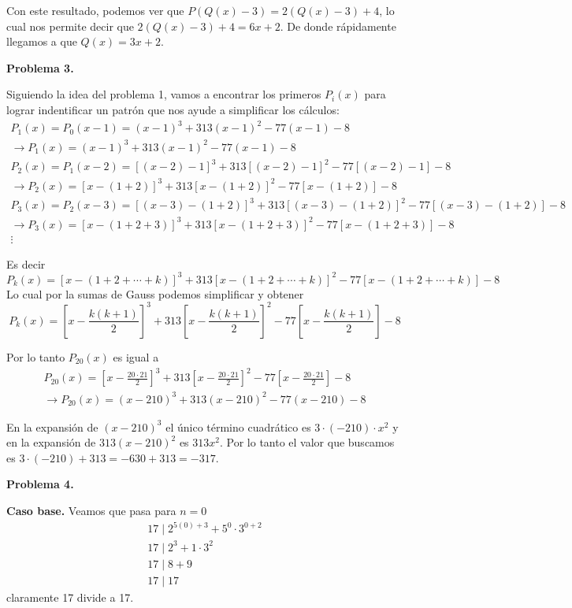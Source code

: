 Con este resultado, podemos ver que $P(Q(x) - 3) = 2(Q(x) - 3) + 4$, lo cual nos permite decir que $2(Q(x) - 3) + 4 =  6x + 2$.
De donde rápidamente llegamos a que $\boxed{Q(x) = 3x + 2}$.

\textbf{Problema 3.}

Siguiendo la idea del problema 1, vamos a encontrar los primeros $P_i(x)$ para lograr indentificar un patrón que nos ayude a simplificar los cálculos:
\begin{gather*}
    P_1(x) = P_0(x - 1) = (x - 1)^3 + 313 (x - 1)^2 - 77(x - 1) - 8\\
    \rightarrow \boxed{P_1(x) = (x - 1)^3 + 313 (x - 1)^2 - 77(x - 1) - 8}\\
    P_2(x) = P_1(x - 2) = [(x - 2) - 1]^3 + 313 [(x - 2) - 1]^2 - 77[(x - 2) - 1] - 8\\
    \rightarrow \boxed{P_2(x) = [x - (1 + 2)]^3 + 313 [x - (1 + 2)]^2 - 77[x - (1 + 2)] - 8 }\\
    P_3(x) = P_2(x - 3) = [(x - 3) - (1 + 2)]^3 + 313 [(x - 3) - (1 + 2)]^2 - 77[(x - 3) - (1 + 2)] - 8 \\
    \rightarrow \boxed{P_3(x) = [x - (1 + 2 + 3)]^3 + 313 [x - (1 + 2 + 3)]^2 - 77[x - (1 + 2 + 3)] - 8 }\\
    \vdots
\end{gather*}

Es decir
\[P_k(x) = [x - (1 + 2 + \cdots + k)]^3 + 313 [x - (1 + 2 + \cdots + k)]^2 - 77[x - (1 + 2 + \cdots + k)] - 8 \]
Lo cual por la sumas de Gauss podemos simplificar y obtener
\[P_k(x) = \left[x - \frac{k(k + 1)}{2}\right]^3 + 313 \left[x - \frac{k(k + 1)}{2}\right]^2 - 77\left[x - \frac{k(k + 1)}{2}\right] - 8 \]

Por lo tanto $P_{20}(x)$ es igual a
\begin{gather*}
    P_{20}(x) = \left[x - \frac{20\cdot21}{2}\right]^3 + 313 \left[x - \frac{20\cdot21}{2}\right]^2 - 77\left[x - \frac{20\cdot21}{2}\right] - 8\\
    \rightarrow \boxed{P_{20}(x) = (x - 210)^3 + 313 (x - 210)^2 - 77(x - 210) - 8}
\end{gather*}

En la expansión de $(x - 210)^3$ el único término cuadrático es $3\cdot(-210)\cdot x^2$ y en la expansión de $313 (x - 210)^2$  es $313x^2$.
Por lo tanto el valor que buscamos es $3\cdot (-210) + 313 = -630 + 313 = \boxed{-317}.$


\textbf{Problema 4.}

\textbf{Caso base.} Veamos que pasa para $n = 0$
\begin{gather*}
    17 \mid 2^{5(0) + 3} + 5^{0} \cdot 3^{0 + 2}\\
    17 \mid 2^{3} + 1\cdot 3^{2} \\
    17 \mid 8 + 9\\
    17 \mid 17
\end{gather*}
claramente 17 divide a 17.


